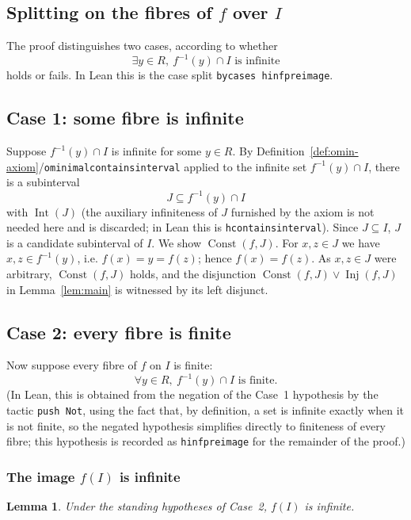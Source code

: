\documentclass[11pt]{article}
\newtheorem{lemma}[definition]{Lemma}
\newcommand{\Lean}[1]{\texttt{\begingroup\def\_{\textunderscore\discretionary{}{}{}}#1\endgroup}}
\newcommand{\Const}{\operatorname{Const}}
\newcommand{\Inj}{\operatorname{Inj}}
\newcommand{\Int}{\operatorname{Int}}
\begin{document}
\subsection{Splitting on the fibres of $f$ over $I$}
 
The proof distinguishes two cases, according to whether
\[
  \exists y\in R,\ f^{-1}(y)\cap I \text{ is infinite}
\]
holds or fails. In Lean this is the case split \Lean{by\_cases h\_inf\_preimage}.
 
\subsection{Case 1: some fibre is infinite}
 
Suppose $f^{-1}(y)\cap I$ is infinite for some $y\in R$. By
Definition~\ref{def:omin-axiom}/\Lean{o\_minimal\_contains\_interval} applied to the infinite set
$f^{-1}(y)\cap I$, there is a subinterval
\[
  J\subseteq f^{-1}(y)\cap I
\]
with $\Int(J)$ (the auxiliary infiniteness of $J$ furnished by the axiom is not needed here and is
discarded; in Lean this is \Lean{h\_contains\_interval}). Since $J\subseteq I$, $J$ is a candidate
subinterval of $I$. We show $\Const(f,J)$. For $x,z\in J$ we have $x,z\in f^{-1}(y)$, i.e.
$f(x)=y=f(z)$; hence $f(x)=f(z)$. As $x,z\in J$ were arbitrary, $\Const(f,J)$ holds, and the
disjunction $\Const(f,J)\vee\Inj(f,J)$ in Lemma~\ref{lem:main} is witnessed by its left disjunct.
 
\subsection{Case 2: every fibre is finite}
 
Now suppose every fibre of $f$ on $I$ is finite:
\[
  \forall y\in R,\ f^{-1}(y)\cap I \text{ is finite}.
\]
(In Lean, this is obtained from the negation of the Case~1 hypothesis by the tactic \Lean{push
Not}, using the fact that, by definition, a set is infinite exactly when it is not finite, so the
negated hypothesis simplifies directly to finiteness of every fibre; this hypothesis is recorded
as \Lean{h\_inf\_preimage} for the remainder of the proof.)
 
\subsubsection{The image $f(I)$ is infinite}
 
\begin{lemma}\label{lem:fI-infinite}
Under the standing hypotheses of Case~2, $f(I)$ is infinite.
\end{lemma}
 
\end{document}
